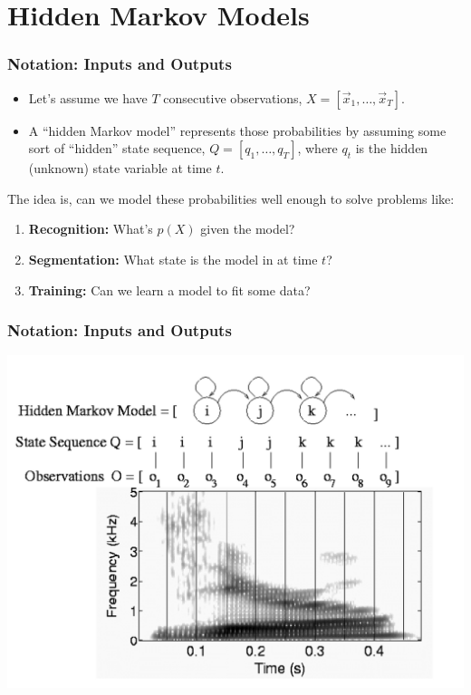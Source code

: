 \documentclass{beamer}
\begin{document}
\section[HMM]{Hidden Markov Models}
\setcounter{subsection}{1}

\begin{frame}
  \frametitle{Notation: Inputs and Outputs}

  \begin{itemize}
  \item Let's assume we have $T$ consecutive 
    observations, $X=[\vec{x}_1,\ldots,\vec{x}_T]$.
  \item A ``hidden Markov model'' represents those probabilities by
    assuming some sort of ``hidden'' state sequence,
    $Q=[q_1,\ldots,q_T]$, where $q_t$ is the hidden (unknown) state
    variable at time $t$.
  \end{itemize}
  The idea is, can we model these probabilities well enough to solve
  problems like:
  \begin{enumerate}
  \item {\bf Recognition:} What's $p(X)$ given the  model?
  \item {\bf Segmentation:} What state is the model in at time $t$?
  \item {\bf Training:} Can we learn a model to fit some data?
  \end{enumerate}
\end{frame}

\begin{frame}
  \frametitle{Notation: Inputs and Outputs}

  \centerline{\includegraphics[width=\textwidth]{hmm_aligned_spectrogram_three.png}}
\end{frame}
\end{document}
